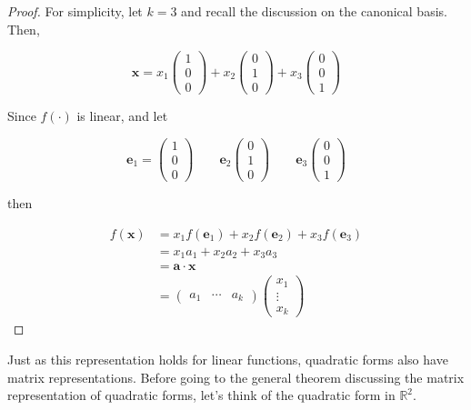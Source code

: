 \documentclass[a4paper,11pt]{article}
\theoremstyle{definition}
\theoremstyle{plain}
\begin{document}
\begin{proof}
For simplicity, let \(k = 3\) and recall the discussion
on the canonical basis. Then,

\[
\mathbf{x} = x_1\begin{pmatrix} 1 \\ 0 \\ 0 \end{pmatrix} + x_2 \begin{pmatrix} 0 \\ 1 \\ 0 \end{pmatrix} + x_3 \begin{pmatrix} 0 \\ 0 \\ 1 \end{pmatrix}
\]

Since \(f(\cdot)\) is linear, and let

\[
\mathbf{e}_1 = \begin{pmatrix} 1 \\ 0 \\ 0 \end{pmatrix} \qquad \mathbf{e}_2 \begin{pmatrix} 0 \\ 1 \\ 0 \end{pmatrix} \qquad \mathbf{e}_3 \begin{pmatrix} 0 \\ 0 \\ 1 \end{pmatrix}
\]

then

\begin{align*}
f(\mathbf{x}) &= x_1 f(\mathbf{e}_1) + x_2 f(\mathbf{e}_2) + x_3 f(\mathbf{e}_3) \\
& = x_1 a_1 + x_2 a_2 + x_3 a_3 \\
& = \mathbf{a}\cdot\mathbf{x} \\
& = \begin{pmatrix} a_1 & \cdots & a_k \end{pmatrix} \begin{pmatrix} x_1 \\ \vdots \\ x_k \end{pmatrix}
\end{align*}
\end{proof}

Just as this representation holds for linear functions, quadratic forms
also have matrix representations. Before going to the general theorem
discussing the matrix representation of quadratic forms, let's think of
the quadratic form in \(\mathbb{R}^2\).
\end{document}
